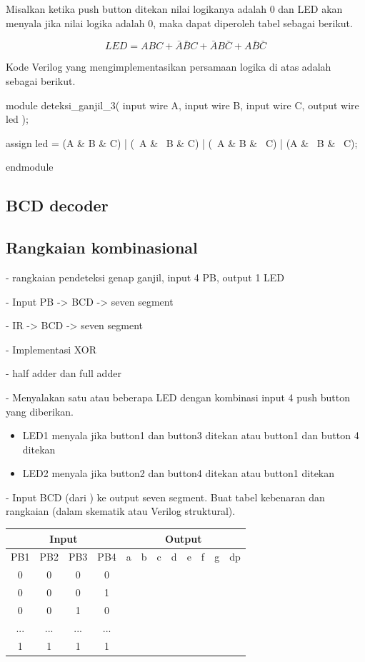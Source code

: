 \documentclass[a4paper,12pt,bahasa]{extarticle}
\begin{document}
Misalkan ketika push button ditekan nilai logikanya adalah 0 dan 
LED akan menyala jika nilai logika adalah 0, maka dapat diperoleh tabel
sebagai berikut.



\begin{equation*}
LED = ABC + \bar{A}\bar{B}C + \bar{A}B\bar{C} + A\bar{B}\bar{C}
\end{equation*}

Kode Verilog yang mengimplementasikan persamaan logika di atas adalah
sebagai berikut.
\begin{verilogcode}
module deteksi_ganjil_3(
  input wire A,
  input wire B,
  input wire C,
  output wire led );

  assign led = (A & B & C) | (~A & ~B & C) | (~A & B & ~C) | (A & ~B & ~C);

endmodule
\end{verilogcode}


\subsection{BCD decoder}


\subsection{Rangkaian kombinasional}

- rangkaian pendeteksi genap ganjil, input 4 PB, output 1 LED

- Input PB -> BCD -> seven segment

- IR -> BCD -> seven segment

- Implementasi XOR

- half adder dan full adder

- Menyalakan satu atau beberapa LED dengan kombinasi input
4 push button yang diberikan.
\begin{itemize}
\item LED1 menyala jika button1 dan button3 ditekan atau button1 dan button 4 ditekan
\item LED2 menyala jika button2 dan button4 ditekan atau button1 ditekan
\end{itemize}

- Input BCD (dari ) ke output seven segment. Buat tabel kebenaran dan rangkaian (dalam skematik
atau Verilog struktural).

{\centering
\begin{tabular}{|c|c|c|c||c|c|c|c|c|c|c|c|}
\hline
\multicolumn{4}{|c||}{Input} & \multicolumn{8}{|c|}{Output} \\
\hline
PB1 & PB2 & PB3 & PB4 & a & b & c & d & e & f & g & dp \\
\hline
0 & 0 & 0 & 0 &  &  &  &  &  &  &  & \\
0 & 0 & 0 & 1 &  &  &  &  &  &  &  & \\
0 & 0 & 1 & 0 &  &  &  &  &  &  &  & \\
... & ... & ... & ... &  &  &  &  &  &  &  & \\
1 & 1 & 1 & 1 &  &  &  &  &  &  &  & \\
\hline
\end{tabular}
\par}
\end{document}
